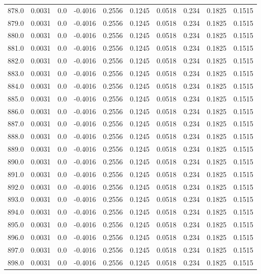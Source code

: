 \begin{longtable}{lrrrrrrrrr}
878.0 & 0.0031 & 0.0 & -0.4016 & 0.2556 & 0.1245 & 0.0518 & 0.234 & 0.1825 & 0.1515 \\
879.0 & 0.0031 & 0.0 & -0.4016 & 0.2556 & 0.1245 & 0.0518 & 0.234 & 0.1825 & 0.1515 \\
880.0 & 0.0031 & 0.0 & -0.4016 & 0.2556 & 0.1245 & 0.0518 & 0.234 & 0.1825 & 0.1515 \\
881.0 & 0.0031 & 0.0 & -0.4016 & 0.2556 & 0.1245 & 0.0518 & 0.234 & 0.1825 & 0.1515 \\
882.0 & 0.0031 & 0.0 & -0.4016 & 0.2556 & 0.1245 & 0.0518 & 0.234 & 0.1825 & 0.1515 \\
883.0 & 0.0031 & 0.0 & -0.4016 & 0.2556 & 0.1245 & 0.0518 & 0.234 & 0.1825 & 0.1515 \\
884.0 & 0.0031 & 0.0 & -0.4016 & 0.2556 & 0.1245 & 0.0518 & 0.234 & 0.1825 & 0.1515 \\
885.0 & 0.0031 & 0.0 & -0.4016 & 0.2556 & 0.1245 & 0.0518 & 0.234 & 0.1825 & 0.1515 \\
886.0 & 0.0031 & 0.0 & -0.4016 & 0.2556 & 0.1245 & 0.0518 & 0.234 & 0.1825 & 0.1515 \\
887.0 & 0.0031 & 0.0 & -0.4016 & 0.2556 & 0.1245 & 0.0518 & 0.234 & 0.1825 & 0.1515 \\
888.0 & 0.0031 & 0.0 & -0.4016 & 0.2556 & 0.1245 & 0.0518 & 0.234 & 0.1825 & 0.1515 \\
889.0 & 0.0031 & 0.0 & -0.4016 & 0.2556 & 0.1245 & 0.0518 & 0.234 & 0.1825 & 0.1515 \\
890.0 & 0.0031 & 0.0 & -0.4016 & 0.2556 & 0.1245 & 0.0518 & 0.234 & 0.1825 & 0.1515 \\
891.0 & 0.0031 & 0.0 & -0.4016 & 0.2556 & 0.1245 & 0.0518 & 0.234 & 0.1825 & 0.1515 \\
892.0 & 0.0031 & 0.0 & -0.4016 & 0.2556 & 0.1245 & 0.0518 & 0.234 & 0.1825 & 0.1515 \\
893.0 & 0.0031 & 0.0 & -0.4016 & 0.2556 & 0.1245 & 0.0518 & 0.234 & 0.1825 & 0.1515 \\
894.0 & 0.0031 & 0.0 & -0.4016 & 0.2556 & 0.1245 & 0.0518 & 0.234 & 0.1825 & 0.1515 \\
895.0 & 0.0031 & 0.0 & -0.4016 & 0.2556 & 0.1245 & 0.0518 & 0.234 & 0.1825 & 0.1515 \\
896.0 & 0.0031 & 0.0 & -0.4016 & 0.2556 & 0.1245 & 0.0518 & 0.234 & 0.1825 & 0.1515 \\
897.0 & 0.0031 & 0.0 & -0.4016 & 0.2556 & 0.1245 & 0.0518 & 0.234 & 0.1825 & 0.1515 \\
898.0 & 0.0031 & 0.0 & -0.4016 & 0.2556 & 0.1245 & 0.0518 & 0.234 & 0.1825 & 0.1515 \\

\end{longtable}

